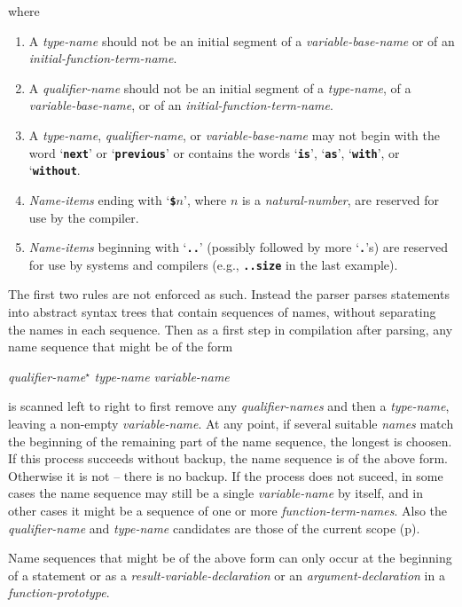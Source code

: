 \documentclass[12pt]{article}
\newcommand{\TT}[1]{{\tt \bfseries #1}}
\newcommand{\pagref}[1]{p\pageref{#1}}
\newcommand{\STAR}{{\Large $^\star$}}
\newcommand{\TMP}{\$}			%
\newenvironment{indpar}[1][0.3in]%
	{\begin{list}{}%
		     {\setlength{\itemsep}{0in}%
		      \setlength{\topsep}{0in}%
		      \setlength{\parsep}{1ex}%
		      \setlength{\labelwidth}{#1}%
		      \setlength{\leftmargin}{#1}%
		      \addtolength{\leftmargin}{\labelsep}}%
	 \item}%
	{\end{list}}
\begin{document}
\begin{indpar}
where
\begin{enumerate}\label{NAME-RULES}
\item A {\em type-name} should not be an initial segment of
a {\em variable-base-name} or of
an {\em initial-function-term-name}.
\item A {\em qualifier-name} should not be an initial segment
of a {\em type-name},
of a {\em variable-base-name},
or of an {\em initial-function-term-name}.
\item
A {\em type-name}, {\em qualifier-name}, or {\em variable-base-name}
may not begin with the word `\TT{next}' or `\TT{previous}' or
contains the words `\TT{is}', `\TT{as}', `\TT{with}', or `\TT{without}.
\item
{\em Name-items} ending with `\TT{\TMP$n$}',
where $n$ is a {\em natural-number}, are
reserved for use by the compiler.
\item
{\em Name-items} beginning with `\TT{..}' (possibly followed by more
`\TT{.}'s) are reserved
for use by systems and compilers (e.g., \TT{..size} in the last example).
\end{enumerate}
\end{indpar}

The first two rules are not enforced as such.  Instead the parser
parses statements into abstract syntax trees that contain
sequences of names, without separating the names in each sequence.
Then as a first step in compilation after parsing,
any name sequence that might be of the form
\begin{center}
{\em qualifier-name}\STAR{} {\em type-name} {\em variable-name}
\end{center}
is scanned left to right to first remove any {\em qualifier-names}
and then a {\em type-name}, leaving a non-empty {\em variable-name}.
At any point, if several suitable {\em names} match the
beginning of the remaining part of the name sequence, the longest
is choosen.  If this process succeeds without backup, the name
sequence is of the above form.  Otherwise it is not -- there is
no backup.  If the process does not suceed, in some
cases the name sequence may still be a single {\em variable-name}
by itself, and in other cases it might be a sequence of one or
more {\em function-term-names}.
Also the {\em qualifier-name} and {\em type-name}
candidates are those of the current scope (\pagref{SCOPE}).

Name sequences that might be of the above form can only occur at
the beginning of a statement or as a {\em result-variable-declaration}
or an {\em argument-declaration} in a {\em function-prototype}.
\end{document}
